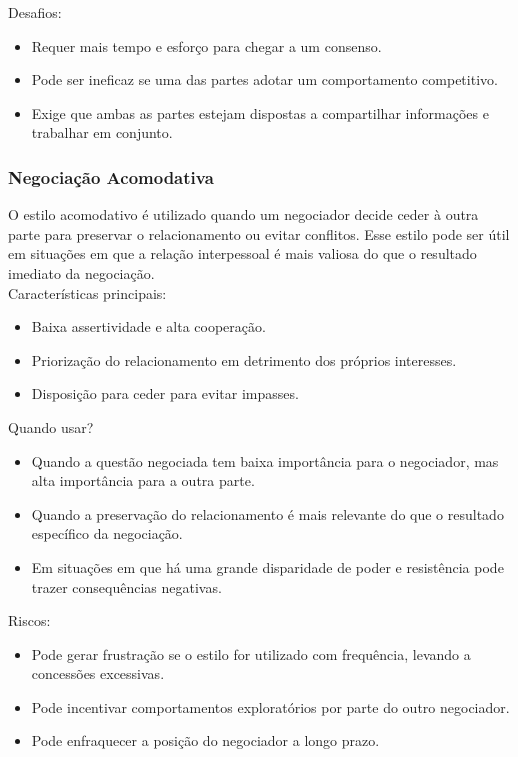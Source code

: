 \documentclass[article,12pt,oneside,a4paper]{article}
\begin{document}
Desafios:

\begin{itemize}
\item Requer mais tempo e esforço para chegar a um consenso.
\item Pode ser ineficaz se uma das partes adotar um comportamento competitivo.
\item Exige que ambas as partes estejam dispostas a compartilhar informações e trabalhar em conjunto.
\end{itemize}
\subsubsection{Negociação Acomodativa}
\label{sec:orgcd7769b}

O estilo acomodativo é utilizado quando um negociador decide ceder à outra parte para preservar o relacionamento ou evitar conflitos. Esse estilo pode ser útil em situações em que a relação interpessoal é mais valiosa do que o resultado imediato da negociação. \\

Características principais:

\begin{itemize}
\item Baixa assertividade e alta cooperação.
\item Priorização do relacionamento em detrimento dos próprios interesses.
\item Disposição para ceder para evitar impasses.
\end{itemize}

Quando usar?

\begin{itemize}
\item Quando a questão negociada tem baixa importância para o negociador, mas alta importância para a outra parte.
\item Quando a preservação do relacionamento é mais relevante do que o resultado específico da negociação.
\item Em situações em que há uma grande disparidade de poder e resistência pode trazer consequências negativas.
\end{itemize}

Riscos:

\begin{itemize}
\item Pode gerar frustração se o estilo for utilizado com frequência, levando a concessões excessivas.
\item Pode incentivar comportamentos exploratórios por parte do outro negociador.
\item Pode enfraquecer a posição do negociador a longo prazo.
\end{itemize}
\end{document}
